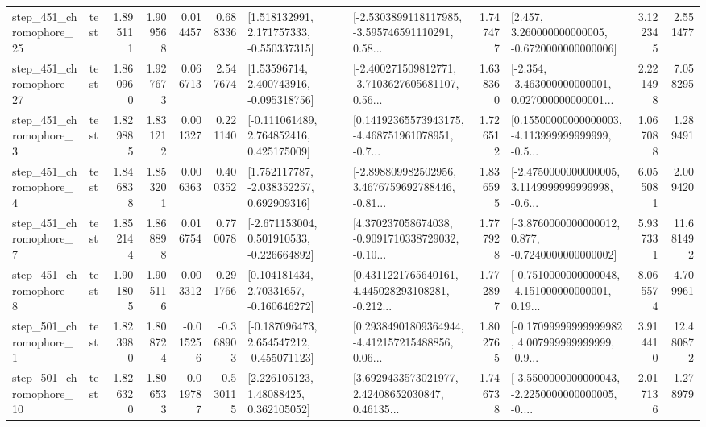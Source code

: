 \begin{tabular}{llrrrrllrlrr}
  step\_451\_chromophore\_25 &      test &      1.895111 &    1.909568 &      0.014457 &  0.688336 &    [1.518132991, 2.171757333, -0.550337315] &  [-2.5303899118117985, -3.595746591110291, 0.58... &       1.747477 &    [2.457, 3.260000000000005, -0.6720000000000006] &            3.122345 &          2.551477 \\
  step\_451\_chromophore\_27 &      test &      1.860960 &    1.927673 &      0.066713 &  2.547674 &     [1.53596714, 2.400743916, -0.095318756] &  [-2.400271509812771, -3.7103627605681107, 0.56... &       1.638360 &  [-2.354, -3.463000000000001, 0.027000000000001... &            2.221498 &          7.058295 \\
   step\_451\_chromophore\_3 &      test &      1.829885 &    1.831212 &      0.001327 &  0.221140 &    [-0.111061489, 2.764852416, 0.425175009] &  [0.14192365573943175, -4.468751961078951, -0.7... &       1.726512 &  [0.15500000000000003, -4.113999999999999, -0.5... &            1.067088 &          1.289491 \\
   step\_451\_chromophore\_4 &      test &      1.846838 &    1.853201 &      0.006363 &  0.400352 &    [1.752117787, -2.038352257, 0.692909316] &  [-2.898809982502956, 3.4676759692788446, -0.81... &       1.836595 &  [-2.4750000000000005, 3.1149999999999998, -0.6... &            6.055081 &          2.009420 \\
   step\_451\_chromophore\_7 &      test &      1.852144 &    1.868898 &      0.016754 &  0.770078 &   [-2.671153004, 0.501910533, -0.226664892] &  [4.370237058674038, -0.9091710338729032, -0.10... &       1.777928 &  [-3.8760000000000012, 0.877, -0.7240000000000002] &            5.937331 &         11.681492 \\
   step\_451\_chromophore\_8 &      test &      1.901805 &    1.905116 &      0.003312 &  0.291766 &     [0.104181434, 2.70331657, -0.160646272] &  [0.4311221765640161, 4.445028293108281, -0.212... &       1.772897 &  [-0.7510000000000048, -4.151000000000001, 0.19... &            8.065574 &          4.709961 \\
   step\_501\_chromophore\_1 &      test &      1.823980 &    1.808724 &     -0.015256 & -0.368903 &   [-0.187096473, 2.654547212, -0.455071123] &  [0.29384901809364944, -4.412157215488856, 0.06... &       1.802765 &  [-0.17099999999999982, 4.007999999999999, -0.9... &            3.914410 &         12.480872 \\
  step\_501\_chromophore\_10 &      test &      1.826320 &    1.806533 &     -0.019787 & -0.530115 &      [2.226105123, 1.48088425, 0.362105052] &  [3.6929433573021977, 2.42408652030847, 0.46135... &       1.746738 &  [-3.5500000000000043, -2.2250000000000005, -0.... &            2.017136 &          1.278979 \\

\end{tabular}
